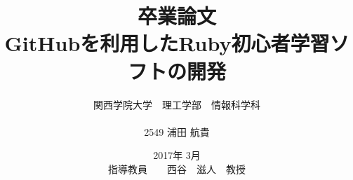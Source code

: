\title{卒業論文\\
\vspace{4cm} GitHubを利用したRuby初心者学習ソフトの開発}
\author{ 関西学院大学　理工学部　情報科学科\\\\2549 浦田 航貴}
\date{\vspace{3cm} 2017年  3月\\
\vspace{3cm} 指導教員　　西谷　滋人　教授}
\maketitle
\setcounter{tocdepth}{4}
\tableofcontents


